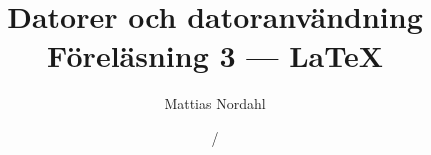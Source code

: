 \documentclass[handout]{beamer}
\author[]{Mattias Nordahl}
\institute{\url{mattias.nordahl@cs.lth.se}}
\date{}
\begin{document}
\title{Datorer och datoranvändning\\Föreläsning 3 --- \LaTeX}

\frame[plain]{
    \maketitle
    \vspace{-2\baselineskip}
}

\date{\the\year/\the\numexpr{}}


\end{document}
